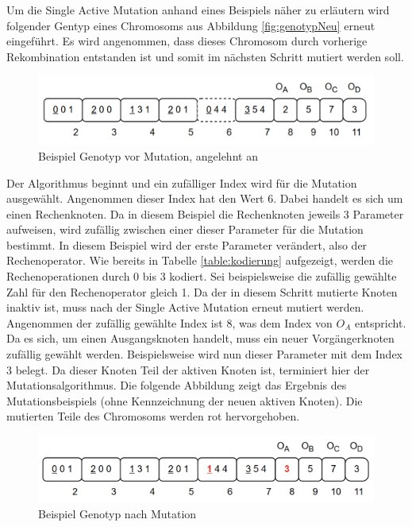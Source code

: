 Um die Single Active Mutation anhand eines Beispiels näher zu erläutern wird folgender Gentyp eines Chromosoms aus Abbildung \ref{fig:genotypNeu} erneut eingeführt.
Es wird angenommen, dass dieses Chromosom durch vorherige Rekombination entstanden ist und somit im nächsten Schritt mutiert werden soll.

\begin{figure}[H]
	\centering
	\includegraphics[scale = 0.5]{Bilder/TorabiBeispielGenotypNeu.png}
	\caption{Beispiel Genotyp vor Mutation, angelehnt an \cite{torabi_using_2022}}
	\label{fig:genotypVorMutation}
\end{figure}

Der Algorithmus beginnt und ein zufälliger Index wird für die Mutation ausgewählt.
Angenommen dieser Index hat den Wert 6.
Dabei handelt es sich um einen Rechenknoten.
Da in diesem Beispiel die Rechenknoten jeweils 3 Parameter aufweisen, wird zufällig zwischen einer dieser Parameter für die Mutation bestimmt.
In diesem Beispiel wird der erste Parameter verändert, also der Rechenoperator.
Wie bereits in Tabelle \ref{table:kodierung} aufgezeigt, werden die Rechenoperationen durch 0 bis 3 kodiert.
Sei beispielsweise die zufällig gewählte Zahl für den Rechenoperator gleich 1.
Da der in diesem Schritt mutierte Knoten inaktiv ist, muss nach der Single Active Mutation erneut mutiert werden.\\
Angenommen der zufällig gewählte Index ist 8, was dem Index von $O_A$ entspricht.
Da es sich, um einen Ausgangsknoten handelt, muss ein neuer Vorgängerknoten zufällig gewählt werden.
Beispielsweise wird nun dieser Parameter mit dem Index 3 belegt.
Da dieser Knoten Teil der aktiven Knoten ist, terminiert hier der Mutationsalgorithmus.
Die folgende Abbildung zeigt das Ergebnis des Mutationsbeispiels (ohne Kennzeichnung der neuen aktiven Knoten).
Die mutierten Teile des Chromosoms werden rot hervorgehoben.

\begin{figure}[H]
	\centering
	\includegraphics[scale = 0.5]{Bilder/GenotypNachMutation.png}
	\caption{Beispiel Genotyp nach Mutation}
	\label{fig:genotypNachMutation}
\end{figure}


